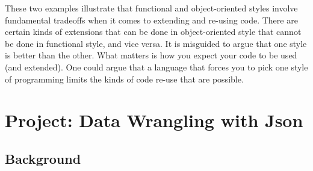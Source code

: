 \documentclass[9pt]{extbook}
\begin{document}
These two examples illustrate that functional
and object-oriented styles involve fundamental tradeoffs when it comes
to extending and re-using code. There are certain kinds of extensions
that can be done in object-oriented style that cannot be done in
functional style, and vice versa.  It is misguided to argue that
one style is better than the other. What matters is how you expect your code
to be used (and extended). One could argue that a language that forces you to
pick one style of programming limits the kinds of code re-use that are possible.










































\chapter{Project: Data Wrangling with Json}

\section{Background}
\end{document}
